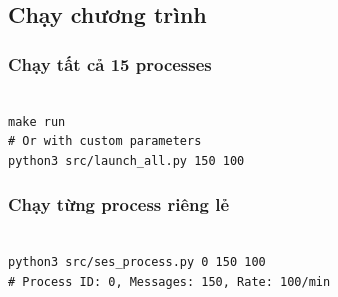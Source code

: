 \subsection{Chạy chương trình}

\subsubsection{Chạy tất cả 15 processes}
\begin{listing}[H]
\begin{verbatim}

make run
# Or with custom parameters
python3 src/launch_all.py 150 100
\end{verbatim}
\caption{Run All Processes}
\end{listing}

\subsubsection{Chạy từng process riêng lẻ}
\begin{listing}[H]
\begin{verbatim}

python3 src/ses_process.py 0 150 100
# Process ID: 0, Messages: 150, Rate: 100/min
\end{verbatim}
\caption{Run Single Process}
\end{listing}